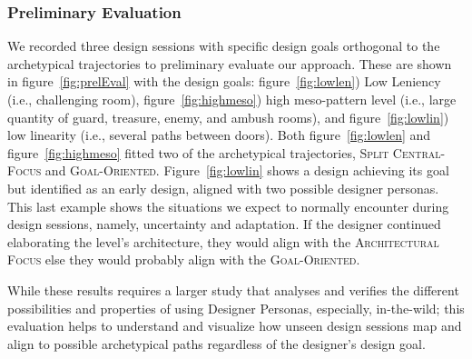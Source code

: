 

\subsubsection{Preliminary Evaluation}

We recorded three design sessions with specific design goals orthogonal to the archetypical trajectories to preliminary evaluate our approach. These are shown in figure~\ref{fig:prelEval} with the design goals: figure~\ref{fig:lowlen}) Low Leniency (i.e., challenging room), figure~\ref{fig:highmeso}) high meso-pattern level (i.e., large quantity of guard, treasure, enemy, and ambush rooms), and figure~\ref{fig:lowlin}) low linearity (i.e., several paths between doors). Both figure~\ref{fig:lowlen} and figure~\ref{fig:highmeso} fitted two of the archetypical trajectories, \textsc{Split Central-Focus} and \textsc{Goal-Oriented}. Figure~\ref{fig:lowlin} shows a design achieving its goal but identified as an early design, aligned with two possible designer personas. This last example shows the situations we expect to normally encounter during design sessions, namely, uncertainty and adaptation. If the designer continued elaborating the level's architecture, they would align with the \textsc{Architectural Focus} else they would probably align with the \textsc{Goal-Oriented}.

While these results requires a larger study that analyses and verifies the different possibilities and properties of using Designer Personas, especially, in-the-wild; this evaluation helps to understand and visualize how unseen design sessions map and align to possible archetypical paths regardless of the designer's design goal. 







